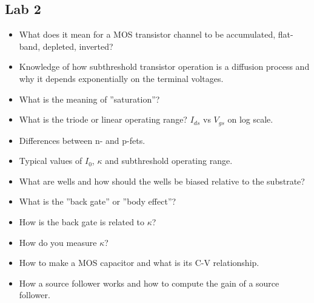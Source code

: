\subsection{Lab 2}
\begin{itemize}
\item What does it mean for a MOS transistor channel to be accumulated, flat-band, depleted,
inverted? \item Knowledge of how subthreshold transistor operation is a diffusion process and
why it depends exponentially on the terminal voltages. \item What is the meaning of ”saturation”?
\item What is the triode or linear operating range? $I_{ds}$ vs $V_{gs}$ on log scale. \item Differences between
n- and p-fets. \item Typical values of $I_0$, $\kappa$ and subthreshold operating range. \item What are wells and how should the wells be biased relative to the substrate? \item What is the ”back gate” or ”body
effect”? \item How is the back gate is related to $\kappa$? \item How do you measure $\kappa$? \item How to make a
MOS capacitor and what is its C-V relationship. \item How a source follower works and how to
compute the gain of a source follower.
\end{itemize}

